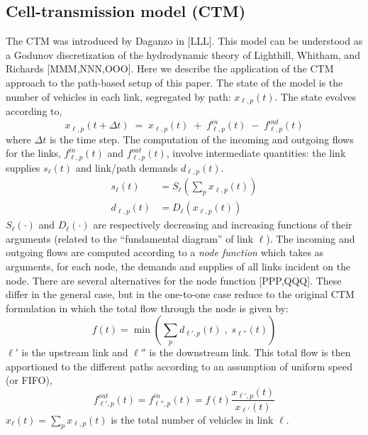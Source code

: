 \subsection{Cell-transmission model (CTM)}
The CTM was introduced by Daganzo in [LLL]. This model can be understood as a Godunov discretization of the hydrodynamic theory of Lighthill, Whitham, and Richards [MMM,NNN,OOO]. Here we describe the application of the CTM approach to the path-based setup of this paper. The state of the model is the number of vehicles in each link, segregated by path: $x_{\ell,p}(t)$. The state evolves according to,
\begin{equation}
x_{\ell,p}(t+\Delta t) \;=\; x_{\ell,p}(t) \;+\; f^{in}_{\ell,p}(t) \;-\; f^{out}_{\ell,p}(t)
\end{equation}
where $\Delta t$ is the time step. The computation of the incoming and outgoing flows for the links, $f^{in}_{\ell,p}(t)$ and $f^{out}_{\ell,p}(t)$, involve intermediate quantities: the link supplies $s_\ell(t)$ and link/path demands $d_{\ell,p}(t)$.
\begin{align}
s_\ell(t) &= S_\ell\left(\sum_{p} x_{\ell,p}(t)\right) \\
d_{\ell,p}(t) &= D_\ell(x_{\ell,p}(t))
\end{align}
$S_\ell(\cdot)$ and $D_\ell(\cdot)$ are respectively decreasing and increasing functions of their arguments (related to the ``fundamental diagram'' of link $\ell$). The incoming and outgoing flows are computed according to a \textit{node function} which takes as arguments, for each node, the demands and supplies of all links incident on the node. There are several alternatives for the node function [PPP,QQQ]. These differ in the general case, but in the one-to-one case reduce to the original CTM formulation in which the total flow through the node is given by:
\begin{equation}
\label{eq:f}
f(t) = \min\left( \sum_{p}d_{\ell',p}(t) \; , \; s_{\ell''}(t)  \right)
\end{equation}
$\ell'$ is the upstream link and $\ell''$ is the downstream link. This total flow is then apportioned to the different paths according to an assumption of uniform speed (or FIFO),
\begin{equation}
f^{out}_{\ell',p}(t) = f^{in}_{\ell'',p}(t) = f(t)\frac{x_{\ell',p}(t)}{x_{\ell'}(t)}
\end{equation}
$x_{\ell}(t) = \sum_{p} x_{\ell,p}(t)$ is the total number of vehicles in link $\ell$.

